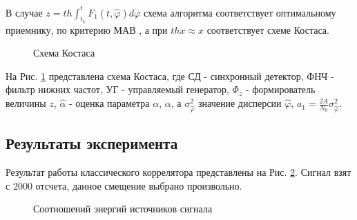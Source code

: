 В случае ${z=th \int_{t_k}^t F_1(t, \hat{\varphi}) \hat{d\varphi}}$ схема алгоритма соответствует оптимальному приемнику, по критерию МАВ \cite{shahtarin-wiener-kalman}, а при ${thx \approx x}$
соответствует схеме Костаса.

\begin{figure}[h]
\center{}
	\caption{Схема Костаса}
	\label{pic:sec4_costas}
\end{figure}

На Рис. \ref{pic:sec4_costas} представлена схема Костаса, где СД - синхронный детектор, ФНЧ - фильтр нижних частот, УГ - управляемый генератор, ${\Phi_z}$ - формирователь величины ${z}$,
${\hat{\alpha}}$ - оценка параметра ${\alpha}$, ${\alpha}$, а ${\sigma_{\hat{\varphi}}^2}$ значение дисперсии ${\hat{\varphi}}$, ${a_1 = \frac{2A}{N_0} \sigma_{\hat{\varphi}}^2}$.

\subsection{Результаты эксперимента}

Результат работы классического коррелятора представлены на Рис. \ref{pic:5mhz_sats_all}. Сигнал взят с 2000 отсчета, данное смещение выбрано произвольно.
\begin{figure}[h]
\center{}
	\caption{Соотношений энергий источников сигнала}
	\label{pic:5mhz_sats_all}
\end{figure}

